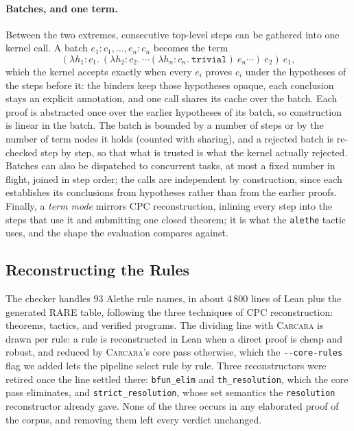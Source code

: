 \documentclass[runningheads]{llncs}
\newcommand{\carcara}{\textsc{Carcara}\xspace}
\newcommand{\alethe}{Alethe\xspace}
\newcommand{\cpc}{CPC\xspace}
\newcommand{\rare}{RARE\xspace}
\newcommand{\rulename}[1]{\texttt{#1}}
\begin{document}
\paragraph{Batches, and one term.} Between the two extremes, consecutive
top-level steps can be gathered into one kernel call. A batch
$e_1 : c_1, \ldots, e_n : c_n$ becomes the term
\[
  (\lambda h_1 : c_1.\ (\lambda h_2 : c_2.\ \cdots (\lambda h_n : c_n.\ \mathtt{trivial})\ e_n \cdots)\ e_2)\ e_1,
\]
which the kernel accepts exactly when every $e_i$ proves $c_i$ under the
hypotheses of the steps before it: the binders keep those hypotheses opaque,
each conclusion stays an explicit annotation, and one call shares its cache
over the batch. Each proof is abstracted once over the earlier hypotheses of
its batch, so construction is linear in the batch. The batch is bounded by a
number of steps or by the number of term nodes it holds (counted with
sharing), and a rejected batch is re-checked step by step, so that what is
trusted is what the kernel actually rejected. Batches can also be dispatched
to concurrent tasks, at most a fixed number in flight, joined in step order;
the calls are independent by construction, since each establishes its
conclusions from hypotheses rather than from the earlier proofs. Finally, a
\emph{term mode} mirrors \cpc reconstruction, inlining every step into the
steps that use it and submitting one closed theorem; it is what the
\texttt{alethe} tactic uses, and the shape the evaluation compares against.

\subsection{Reconstructing the Rules}
\label{sec:rules}

The checker handles 93 \alethe rule names, in about 4\,800 lines of Lean
plus the generated \rare table, following the three techniques of \cpc
reconstruction: theorems, tactics, and verified programs. The dividing line
with \carcara is drawn per rule: a rule is reconstructed in Lean when a
direct proof is cheap and robust, and reduced by \carcara's core pass
otherwise, which the \texttt{-{}-core-rules} flag we added lets the pipeline
select rule by rule. Three reconstructors were retired once the line settled
there: \rulename{bfun\_elim} and \rulename{th\_resolution}, which the core
pass eliminates, and \rulename{strict\_resolution}, whose set semantics the
\rulename{resolution} reconstructor already gave. None of the three occurs in
any elaborated proof of the corpus, and removing them left every verdict
unchanged.
\end{document}
